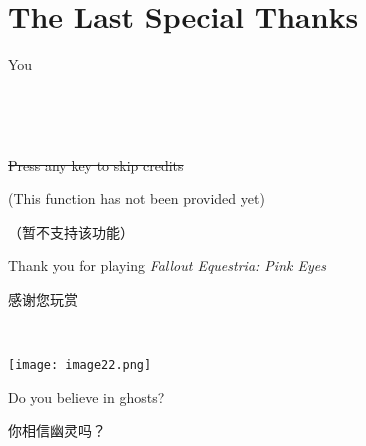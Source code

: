 \clearpage



\fancyhf{} %

\fancyhead[LE,RO]{\thepage}


% 

~\vfill

\section*{The Last Special Thanks}

\begin{center}

    \Large You

\end{center}

~\vfill

\clearpage


~\vfill

\begin{center}

\begin{englishpar}
    \sout{Press any key to skip credits}
    
    (This function has not been provided yet)
\end{englishpar}


（暂不支持该功能）

\begin{englishpar}
    Thank you for playing \emph{Fallout Equestria: Pink Eyes}
\end{englishpar}

感谢您玩赏
\end{center}

~\vfill

\texttt{[image: image22.png]}

\begin{motto}
    Do you believe in ghosts?

    你相信幽灵吗？
\end{motto}

